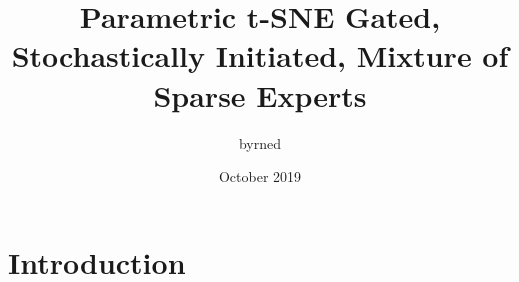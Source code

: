 \documentclass{article}
\title{Parametric t-SNE Gated, Stochastically Initiated, Mixture of Sparse Experts}
\author{byrned }
\date{October 2019}
\begin{document}
\maketitle

\section{Introduction}
\end{document}
